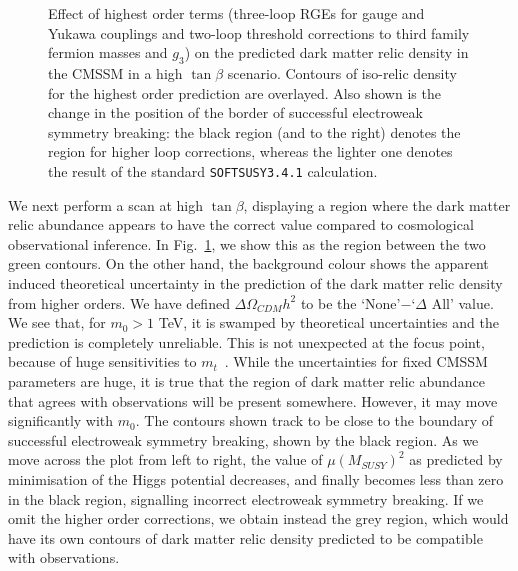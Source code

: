 \documentclass[final,3p,times,pdflatex]{elsarticle}
\begin{document}
\begin{figure}
\begin{center}
\begin{picture}
\end{picture}
\end{center}
\caption{\label{fig:dm} Effect of highest order terms (three-loop
  RGEs for gauge and Yukawa couplings and two-loop threshold corrections to
  third family fermion masses and $g_3$) on the predicted dark matter relic
  density in the CMSSM in a high $\tan \beta$ scenario. Contours of iso-relic
  density for the highest order prediction are overlayed. Also shown is the
  change in the position of the border of successful electroweak symmetry
  breaking: the black region 
  (and to the right) denotes the region for higher loop corrections, whereas
  the lighter one denotes the result of the standard {\tt SOFTSUSY3.4.1}
  calculation.} 
\end{figure}
We next perform a scan at high $\tan \beta$, displaying a region where the
dark matter relic abundance appears to have the correct value compared to
cosmological observational inference. 
In Fig.~\ref{fig:dm}, we show this as the region between the two green
contours. On the other hand, the background colour shows the apparent induced 
theoretical uncertainty in the prediction of the dark matter relic density
from higher orders. We have defined
$\Delta \Omega_{CDM} h^2$ to be the `None'$-$`$\Delta$ All' value. 
We see that, for $m_0>1$ TeV, it is swamped by theoretical uncertainties and
the prediction is completely unreliable. This is not unexpected at the focus
point, because of huge sensitivities to $m_t$~\cite{Allanach:2012qd}. While
the uncertainties for 
fixed CMSSM parameters are huge, it is true that the region of dark
matter relic abundance that agrees with observations will be present
somewhere. However, it may move significantly with $m_0$. The contours shown
track to be close to the boundary of successful electroweak symmetry breaking,
shown by the black region. As we move across the plot from
left to right, the value of $\mu(M_{SUSY})^2$ as predicted by minimisation of
the Higgs potential decreases, and finally becomes less than zero in the black
region, signalling incorrect electroweak symmetry breaking. 
If we omit the
higher order corrections, we obtain instead the grey region, which would have
its own contours of dark matter relic density predicted to be compatible with
observations. 
\end{document}
